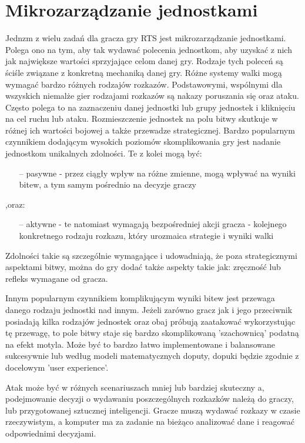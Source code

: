 \documentclass[12pt]{report}
\begin{document}
\section {Mikrozarządzanie jednostkami} 
Jednzm z wielu zadań dla gracza gry RTS jest mikrozarządzanie jednostkami. Polega ono na tym, aby tak wydawać polecenia jednostkom, aby uzyskać z nich jak największe wartości sprzyjające celom danej gry. Rodzaje tych poleceń są ściśle związane z konkretną mechaniką danej gry. Różne systemy walki mogą wymagać bardzo różnych rodzajów rozkazów. Podstawowymi, wspólnymi dla wszyskich niemalże gier rodzajami rozkazów są nakazy poruszania się oraz ataku. Często polega to na zaznaczeniu danej jednostki lub grupy jednostek i kliknięciu na cel ruchu lub ataku. Rozmieszczenie jednostek na polu bitwy skutkuje w różnej ich wartości bojowej a także przewadze strategicznej. Bardzo popularnym czynnikiem dodającym wysokich poziomów skomplikowania gry jest nadanie jednostkom unikalnych zdolności. Te z kolei mogą być: 

\begin{itemize}
\item[--] pasywne - przez ciągły wpływ na różne zmienne, mogą wpływać na wyniki bitew, a tym samym pośrednio na decyzje graczy
\end{itemize} 
,oraz:
\begin{itemize}
\item[--] aktywne - te natomiast wymagają bezpośredniej akcji gracza - kolejnego konkretnego rodzaju rozkazu, który urozmaica strategie i wyniki walki 
\end{itemize} 

Zdolności takie są szczególnie wymagające i udowadniają, że poza strategicznymi aspektami bitwy, można do gry dodać także aspekty takie jak: zręczność lub refleks wymagane od gracza.

Innym popularnym czynnikiem komplikującym wyniki bitew jest przewaga danego rodzaju jednostki nad innym. Jeżeli zarówno gracz jak i jego przeciwnik posiadają kilka rodzajów jednostek oraz obaj próbują zaatakować wykorzystując tę przewagę, to pole bitwy staje się bardzo skomplikowaną 'szachownicą' podatną na efekt motyla. Może być to bardzo łatwo implementowane i balansowane sukcesywnie lub według modeli matematycznych doputy, dopuki będzie zgodnie z docelowym 'user experience'.

Atak może być w różnych scenariuszach mniej lub bardziej skuteczny a, podejmowanie decyzji o wydawaniu poszczególnych rozkazków należą do graczy, lub przygotowanej sztucznej inteligencji. Gracze muszą wydawać rozkazy w czasie rzeczywistym, a komputer ma za zadanie na bieżąco analizować dane i reagować odpowiednimi decyzjami.
\end{document}
